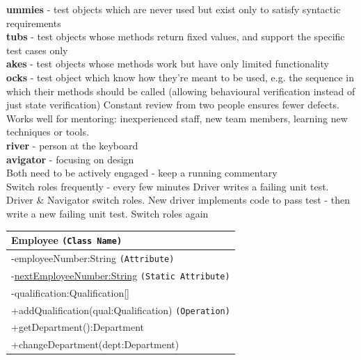 \documentclass[number]{assignment}
\begin{document}
\begin{landscape}
\begin{multicols}{3}
\textbf{ummies} - test objects which are never used but exist only to satisfy syntactic requirements\\
\textbf{tubs} - test objects whose methods return fixed values, and support the specific test cases only\\
\textbf{akes} - test objects whose methods work but have only limited functionality\\
\textbf{ocks} - test object which know how they're meant to be used, e.g. the sequence in which their methods should be called (allowing behavioural verification instead of just state verification)
Constant review from two people ensures fewer defects. Works well for mentoring: inexperienced staff, new team members, learning new techniques or tools.\\
\textbf{river} - person at the keyboard\\
\textbf{avigator} - focusing on design\\
Both need to be actively engaged - keep a running commentary\\
Switch roles frequently - every few minutes
Driver writes a failing unit test. Driver \& Navigator switch roles. New driver implements code to pass test - then write a new failing unit test. Switch roles again
\begin{tabular}{|l|}
\hline
Employee \texttt{(Class Name)}\\\hline
-employeeNumber:String \texttt{(Attribute)}\\
-\underline{nextEmployeeNumber:String} \texttt{(Static Attribute)}\\
-qualification:Qualification[]\\\hline
+addQualification(qual:Qualification) \texttt{(Operation)}\\
+getDepartment():Department\\
+changeDepartment(dept:Department)\\\hline
\end{tabular}
\end{multicols}
\end{landscape}
\end{document}
